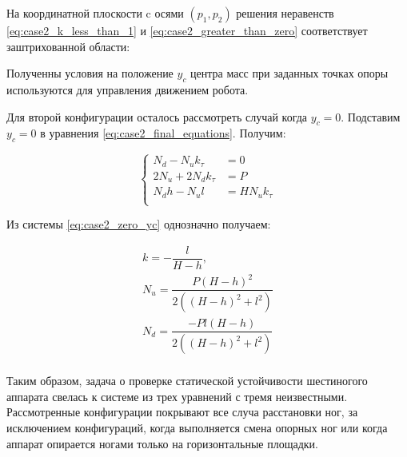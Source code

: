 На координатной плоскости c осями $(p_1, p_2)$ решения неравенств \ref{eq:case2_k_less_than_1} и \ref{eq:case2_greater_than_zero} соответствует заштрихованной области:



Полученны условия на положение $y_c$ центра масс при заданных точках опоры используются для управления движением робота.


Для второй конфигурации осталось рассмотреть случай когда $y_c = 0$. Подставим $y_c = 0$ в уравнения \ref{eq:case2_final_equations}. Получим:

\begin{equation}
  \label{eq:case2_zero_yc}
    \left\{
    \begin{alignedat}{3}
      N_d - N_uk_\tau &= 0 \\
      2N_u+2N_dk_\tau &= P \\
      N_dh - N_ul &= HN_uk_\tau\\
    \end{alignedat}
    \right.
\end{equation}

Из системы \ref{eq:case2_zero_yc} однозначно получаем:

\begin{equation}
  \label{eq:case2_zero_yc_solution}
  \begin{alignedat}{3}
  k = -\dfrac{l}{H-h},\\
  N_u = \dfrac{P(H-h)^2}{2((H-h)^2+l^2)}\\
  N_d = \dfrac{-Pl(H - h)}{2((H-h)^2+l^2)}\\
  \end{alignedat}
\end{equation}


Таким образом, задача о проверке статической устойчивости шестиногого аппарата свелась к системе из трех уравнений с тремя неизвестными. Рассмотренные конфигурации покрывают все случа расстановки ног, за исключением конфигураций, когда выполняется смена опорных ног или когда аппарат опирается ногами только на горизонтальные площадки.
